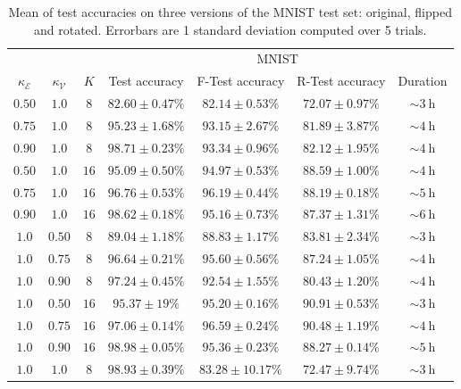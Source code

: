 \documentclass{article}
\begin{document}
\begin{table}[h!]
\label{table:equivariance_leaking_results}
\centering 
\caption{Mean of test accuracies on three versions of the MNIST test set: original, flipped and rotated. Errorbars are 1 standard deviation computed over 5 trials.}
\begin{tabular}{c c c c c c c}
\toprule
& & & \multicolumn{4}{c}{MNIST} \\
$\kappa_{\mathcal{E}}$ & $\kappa_{\mathcal{V}}$ & $K$ & Test accuracy & F-Test accuracy & R-Test accuracy & Duration\\
\midrule
$0.50$ & $1.0$ & $8$ & $82.60 \pm 0.47 \%$ & $82.14 \pm 0.53 \%$ & $72.07 \pm 0.97 \%$ & $\sim \SI{3}{\hour}$ \\
$0.75$ & $1.0$ & $8$ & $95.23 \pm 1.68 \%$ & $93.15 \pm 2.67 \%$ & $81.89 \pm 3.87 \%$ & $\sim \SI{4}{\hour}$ \\
$0.90$ & $1.0$ & $8$ & $98.71 \pm 0.23 \%$ & $93.34 \pm 0.96 \%$ & $82.12 \pm 1.95 \%$ & $\sim \SI{4}{\hour}$ \\
$0.50$ & $1.0$ & $16$ & $95.09 \pm 0.50 \%$ & $94.97 \pm 0.53 \%$ & $88.59 \pm 1.00 \%$ & $\sim \SI{4}{\hour}$ \\
$0.75$ & $1.0$ & $16$ & $96.76 \pm 0.53 \%$ & $\boldsymbol{96.19 \pm 0.44 \%}$ & $\boldsymbol{88.19 \pm 0.18 \%}$ & $\sim \SI{5}{\hour}$ \\
$0.90$ & $1.0$ & $16$ & $98.62 \pm 0.18 \%$ & $95.16 \pm 0.73 \%$ & $87.37 \pm 1.31 \%$ & $\sim \SI{6}{\hour}$ \\
\midrule
$1.0$ & $0.50$ & $8$ & $89.04 \pm 1.18 \%$ & $88.83 \pm 1.17 \%$ & $83.81 \pm 2.34 \%$ & $\sim \SI{3}{\hour}$ \\
$1.0$ & $0.75$ & $8$ & $96.64 \pm 0.21 \%$ & $95.60 \pm 0.56 \%$ & $87.24 \pm 1.05 \%$ & $\sim \SI{4}{\hour}$ \\
$1.0$ & $0.90$ & $8$ & $97.24 \pm 0.45 \%$ & $92.54 \pm 1.55 \%$ & $80.43 \pm 1.20 \%$ & $\sim \SI{4}{\hour}$ \\
$1.0$ & $0.50$ & $16$ & $95.37 \pm 19 \%$ & $95.20 \pm 0.16 \%$ & $\boldsymbol{90.91 \pm 0.53 \%}$ & $\sim \SI{3}{\hour}$ \\
$1.0$ & $0.75$ & $16$ & $97.06 \pm 0.14 \%$ & $\boldsymbol{96.59 \pm 0.24 \%}$ & $90.48 \pm 1.19 \%$ & $\sim \SI{4}{\hour}$ \\
$1.0$ & $0.90$ & $16$ & $98.98 \pm 0.05 \%$ & $95.36 \pm 0.23 \%$ & $88.27 \pm 0.14 \%$ & $\sim \SI{5}{\hour}$ \\
\midrule
$1.0$ & $1.0$ & $8$ & $98.93 \pm 0.39 \%$ & $83.28 \pm 10.17 \%$ & $72.47 \pm 9.74 \%$ & $\sim \SI{3}{\hour}$ \\
\bottomrule
\end{tabular}
\end{table}
\end{document}
